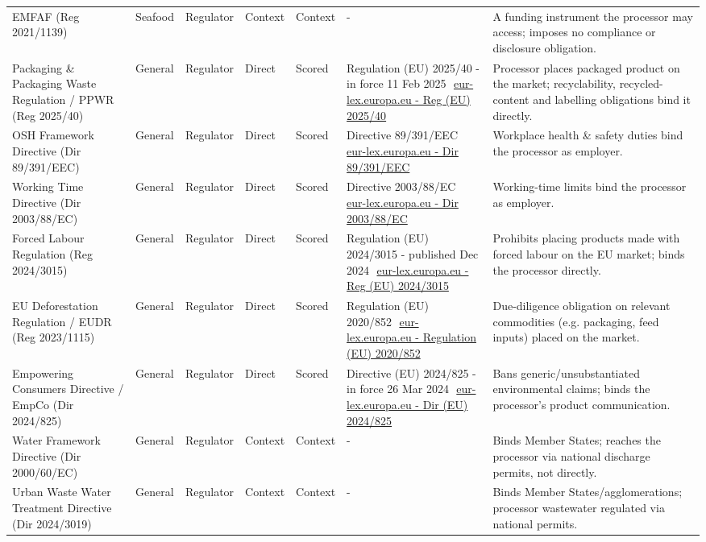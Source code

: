 \begin{landscape}
\begin{longtable}{p{2.9cm}p{1.2cm}p{1.3cm}p{1.2cm}p{1.4cm}p{3.2cm}p{5.9cm}}
EMFAF (Reg 2021/1139) & Seafood & Regulator & Context & Context & - & A funding instrument the processor may access; imposes no compliance or disclosure obligation. \\
Packaging \& Packaging Waste Regulation / PPWR (Reg 2025/40) & General & Regulator & Direct & Scored & Regulation (EU) 2025/40 - in force 11 Feb 2025~\,\href{https://eur-lex.europa.eu/eli/reg/2025/40/oj}{eur-lex.europa.eu - Reg (EU) 2025/40} & Processor places packaged product on the market; recyclability, recycled-content and labelling obligations bind it directly. \\
OSH Framework Directive (Dir 89/391/EEC) & General & Regulator & Direct & Scored & Directive 89/391/EEC~\,\href{https://eur-lex.europa.eu/eli/dir/1989/391/oj}{eur-lex.europa.eu - Dir 89/391/EEC} & Workplace health \& safety duties bind the processor as employer. \\
Working Time Directive (Dir 2003/88/EC) & General & Regulator & Direct & Scored & Directive 2003/88/EC~\,\href{https://eur-lex.europa.eu/eli/dir/2003/88/oj}{eur-lex.europa.eu - Dir 2003/88/EC} & Working-time limits bind the processor as employer. \\
Forced Labour Regulation (Reg 2024/3015) & General & Regulator & Direct & Scored & Regulation (EU) 2024/3015 - published Dec 2024~\,\href{https://eur-lex.europa.eu/eli/reg/2024/3015/oj}{eur-lex.europa.eu - Reg (EU) 2024/3015} & Prohibits placing products made with forced labour on the EU market; binds the processor directly. \\
EU Deforestation Regulation / EUDR (Reg 2023/1115) & General & Regulator & Direct & Scored & Regulation (EU) 2020/852~\,\href{https://eur-lex.europa.eu/eli/reg/2020/852/oj}{eur-lex.europa.eu - Regulation (EU) 2020/852} & Due-diligence obligation on relevant commodities (e.g. packaging, feed inputs) placed on the market. \\
Empowering Consumers Directive / EmpCo (Dir 2024/825) & General & Regulator & Direct & Scored & Directive (EU) 2024/825 - in force 26 Mar 2024~\,\href{https://eur-lex.europa.eu/eli/dir/2024/825/oj}{eur-lex.europa.eu - Dir (EU) 2024/825} & Bans generic/unsubstantiated environmental claims; binds the processor's product communication. \\
Water Framework Directive (Dir 2000/60/EC) & General & Regulator & Context & Context & - & Binds Member States; reaches the processor via national discharge permits, not directly. \\
Urban Waste Water Treatment Directive (Dir 2024/3019) & General & Regulator & Context & Context & - & Binds Member States/agglomerations; processor wastewater regulated via national permits. \\

\end{longtable}
\end{landscape}

